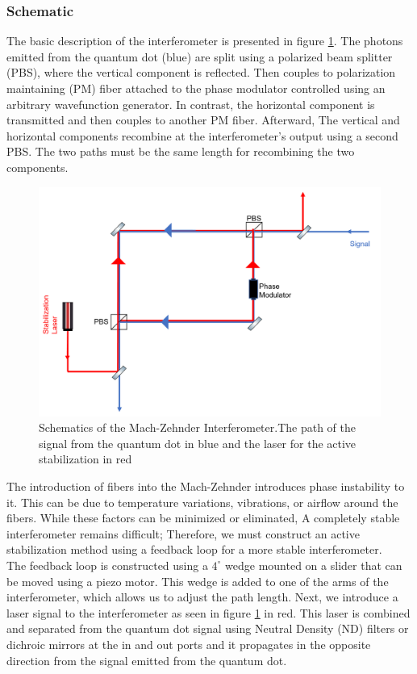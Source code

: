 \subsubsection{Schematic}
The basic description of the interferometer is presented in figure \ref{fig:Mach_zhender}. The photons emitted from the quantum dot (blue) are split using a polarized beam splitter (PBS), where the vertical component is reflected. Then couples to polarization maintaining (PM) fiber attached to the phase modulator controlled using an arbitrary wavefunction generator. In contrast, the horizontal component is transmitted and then couples to another PM fiber. Afterward, The vertical and horizontal components recombine at the interferometer's output using a second PBS. The two paths must be the same length for recombining the two components.
\begin{figure}[H]
		\centering
		\includegraphics[scale=0.70]{figures/Mach_Zhender Interferometer.png}
		\caption{Schematics of the Mach-Zehnder Interferometer.The path of the signal from the quantum dot in blue and the laser for the active stabilization in red}
		\label{fig:Mach_zhender}
	\end{figure}
 The introduction of fibers into the Mach-Zehnder introduces phase instability to it. This can be due to temperature variations, vibrations, or airflow around the fibers. While these factors can be minimized or eliminated, A completely stable interferometer remains difficult; Therefore, we must construct an active stabilization method using a feedback loop for a more stable interferometer.\\
 The feedback loop is constructed using a $4^{\circ}$ wedge mounted on a slider that can be moved using a piezo motor. This wedge is added to one of the arms of the interferometer, which allows us to adjust the path length. Next, we introduce a laser signal to the interferometer as seen in figure \ref{fig:Mach_zhender} in red. This laser is combined and separated from the quantum dot signal using Neutral Density (ND) filters or dichroic mirrors at the in and out ports and it propagates in the opposite direction from the signal emitted from the quantum dot. \\
